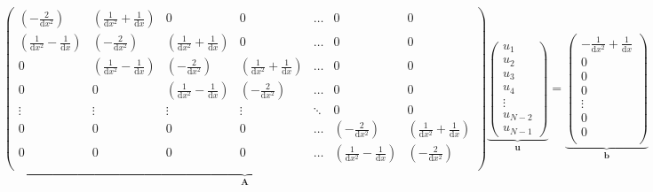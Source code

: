 \documentclass[a4paper]{article}
\begin{document}
\[
    \underbrace{\begin{pmatrix}
        (-\frac{2}{\mathrm{d}x^2}) & (\frac{1}{\mathrm{d}x^2} + \frac{1}{\mathrm{d}x}) & 0 & 0 & \hdots & 0 & 0 \\
        (\frac{1}{\mathrm{d}x^2} - \frac{1}{\mathrm{d}x}) & (-\frac{2}{\mathrm{d}x^2}) & (\frac{1}{\mathrm{d}x^2} + \frac{1}{\mathrm{d}x}) & 0 & \hdots & 0 & 0 \\
        0 & (\frac{1}{\mathrm{d}x^2} - \frac{1}{\mathrm{d}x}) & (-\frac{2}{\mathrm{d}x^2}) & (\frac{1}{\mathrm{d}x^2} + \frac{1}{\mathrm{d}x}) & \hdots & 0 & 0 \\
        0 & 0 & (\frac{1}{\mathrm{d}x^2} - \frac{1}{\mathrm{d}x}) & (-\frac{2}{\mathrm{d}x^2}) & \hdots & 0 & 0 \\
        \vdots & \vdots & \vdots & \vdots & \ddots & 0 & 0 \\
        0 & 0 & 0 & 0 & \hdots & (-\frac{2}{\mathrm{d}x^2}) & (\frac{1}{\mathrm{d}x^2} + \frac{1}{\mathrm{d}x}) \\
        0 & 0 & 0 & 0 & \hdots & (\frac{1}{\mathrm{d}x^2} - \frac{1}{\mathrm{d}x}) & (-\frac{2}{\mathrm{d}x^2}) \\
    \end{pmatrix}}_{\mathbf{A}}
    \underbrace{\begin{pmatrix}
        u_1 \\
        u_2 \\
        u_3 \\
        u_4 \\
        \vdots \\
        u_{N-2} \\
        u_{N-1}
    \end{pmatrix}}_{\mathbf{u}}
    =
    \underbrace{\begin{pmatrix}
        -\frac{1}{\mathrm{d}x^2} + \frac{1}{\mathrm{d}x} \\
        0 \\
        0 \\
        0 \\
        \vdots \\
        0 \\
        0\\
    \end{pmatrix}}_{\mathbf{b}}
\]


\end{document}
